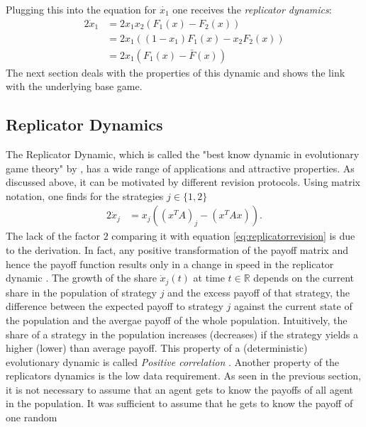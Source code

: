 \documentclass[11pt]{article}
\newcommand{\realnumb}{\mathbb{R}}
\begin{document}
Plugging this into the equation for $\dot{x_1}$ one receives the 
\textit{replicator dynamics}:
\begin{alignat*}{2}
        \label{eq:replicatorrevision}
        \dot{x}_1 &= 2 x_1 x_2 (F_1(x) - F_2(x)) \\
                  &= 2 x_1 ((1-x_1) F_1(x) - x_2 F_2(x)) \\
                  &= 2 x_1 (F_1(x) - \bar{F}(x)) 
\end{alignat*}
The next section deals with the properties of this dynamic and shows the 
link with the underlying base game.
            
\subsection{Replicator Dynamics}
\label{sec:replicatordynamic}
The Replicator Dynamic, which is called the "best know dynamic in
evolutionary game theory" by \cite{sandholm_populaton_2010}, has a wide range of applications
and attractive properties. As discussed above, it can be motivated by 
different revision protocols. Using matrix notation, one finds for 
the strategies $j \in \{1,2\}$
\begin{alignat}{2}
        \dot{x}_j &= x_j\left(\left(x^T A\right)_j - \left(x^T A x\right)\right) 
        \label{eq:replicator}.
\end{alignat}
The lack of the factor $2$ comparing it with equation 
\eqref{eq:replicatorrevision} is due to the derivation. In fact, any
positive transformation of the payoff matrix and hence the payoff function
results only in a change in speed in the replicator dynamic
\parencite[73]{weibull_evolutionary_1997}.
The growth of the share $\dot{x}_j(t)$ at time $t \in \realnumb$ depends 
on the current share in the population of strategy $j$ and the 
excess payoff of that strategy, the difference between the expected 
payoff to strategy $j$ against the current state of the population and the
avergae payoff of the whole population.
Intuitively, the share of a strategy in the population increases (decreases) 
if the strategy yields a higher (lower) than average payoff. 
This property of a (deterministic) evolutionary dynamic is called 
\textit{Positive correlation} \parencite{sandholm_population_2010}.
Another property of the replicators dynamics is the low data requirement. As 
seen in the previous section, it is not necessary to assume that an agent
gets to know the payoffs of all agent in the population.
It was sufficient to assume that he gets to know the payoff of one random 
\end{document}
